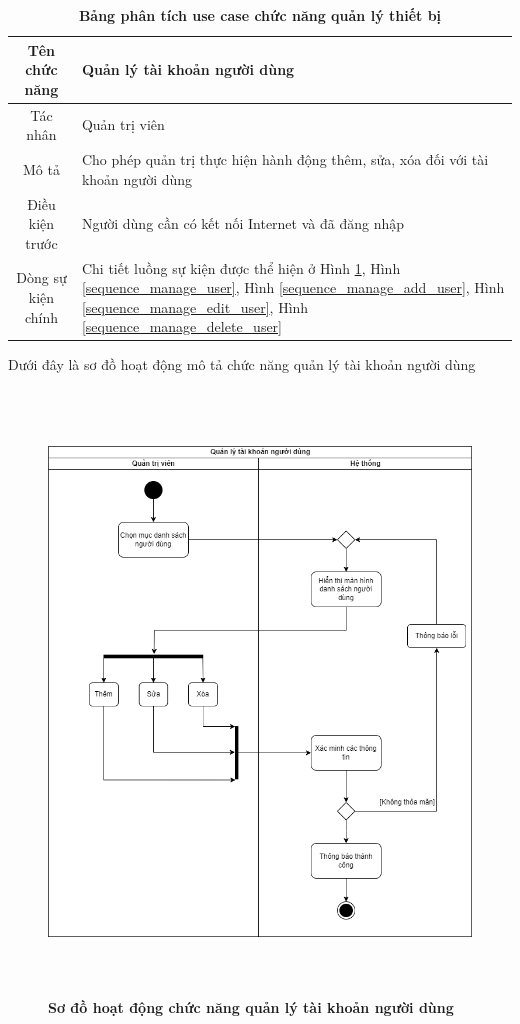   \begin{table}[H]
    \caption{\bfseries \fontsize{12pt}{0pt}\selectfont Bảng phân tích use case chức năng quản lý thiết bị}
    \centering
    \begin{tabularx}{0.9\textwidth}{|c|X|}
      \hline
      \textbf{Tên chức năng} & \textbf{Quản lý tài khoản người dùng} \\
      \hline
      Tác nhân & Quản trị viên \\
      \hline
      Mô tả & Cho phép quản trị thực hiện hành động thêm, sửa, xóa đối với tài khoản người dùng \\
      \hline
      Điều kiện trước & Người dùng cần có kết nối Internet và đã đăng nhập \\
      \hline
      Dòng sự kiện chính & 
        Chi tiết luồng sự kiện được thể hiện ở Hình \ref{activity_user_management}, Hình \ref{sequence_manage_user}, 
        Hình \ref{sequence_manage_add_user}, Hình \ref{sequence_manage_edit_user}, Hình \ref{sequence_manage_delete_user} 
        \\
      \hline
    \end{tabularx}
  \end{table}
  Dưới đây là sơ đồ hoạt động mô tả chức năng quản lý tài khoản người dùng
  \begin{figure}[H]
    \centering
    \includegraphics[width=13.5cm,height=16cm]{Images/activity/activity_manage_user.png}
    \caption[Sơ đồ hoạt động chức năng quản lý tài khoản người dùng]{\bfseries \fontsize{12pt}{0pt}
    \selectfont Sơ đồ hoạt động chức năng quản lý tài khoản người dùng}
    \label{activity_user_management} %
  \end{figure}

